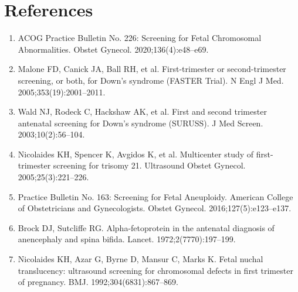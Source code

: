 \section*{References}
\begin{enumerate}
  \item ACOG Practice Bulletin No. 226: Screening for Fetal Chromosomal Abnormalities. Obstet Gynecol. 2020;136(4):e48--e69.
  \item Malone FD, Canick JA, Ball RH, et al. First-trimester or second-trimester screening, or both, for Down's syndrome (FASTER Trial). N Engl J Med. 2005;353(19):2001--2011.
  \item Wald NJ, Rodeck C, Hackshaw AK, et al. First and second trimester antenatal screening for Down's syndrome (SURUSS). J Med Screen. 2003;10(2):56--104.
  \item Nicolaides KH, Spencer K, Avgidos K, et al. Multicenter study of first-trimester screening for trisomy 21. Ultrasound Obstet Gynecol. 2005;25(3):221--226.
  \item Practice Bulletin No. 163: Screening for Fetal Aneuploidy. American College of Obstetricians and Gynecologists. Obstet Gynecol. 2016;127(5):e123--e137.
  \item Brock DJ, Sutcliffe RG. Alpha-fetoprotein in the antenatal diagnosis of anencephaly and spina bifida. Lancet. 1972;2(7770):197--199.
  \item Nicolaides KH, Azar G, Byrne D, Mansur C, Marks K. Fetal nuchal translucency: ultrasound screening for chromosomal defects in first trimester of pregnancy. BMJ. 1992;304(6831):867--869.
\end{enumerate}

\clearpage
